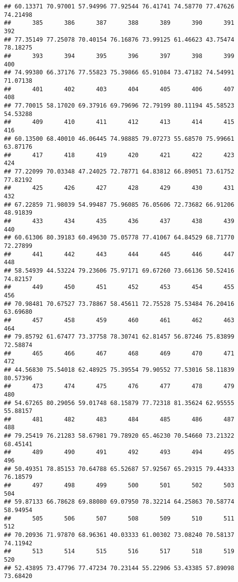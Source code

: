 \documentclass[
]{article}
\begin{document}
\begin{verbatim}
## 60.13371 70.97001 57.94996 77.92544 76.41741 74.58770 77.47626 74.21498 
##      385      386      387      388      389      390      391      392 
## 77.35149 77.25078 70.40154 76.16876 73.99125 61.46623 43.75474 78.18275 
##      393      394      395      396      397      398      399      400 
## 74.99380 66.37176 77.55823 75.39866 65.91084 73.47182 74.54991 71.07138 
##      401      402      403      404      405      406      407      408 
## 77.70015 58.17020 69.37916 69.79696 72.79199 80.11194 45.58523 54.53288 
##      409      410      411      412      413      414      415      416 
## 60.13500 68.40010 46.06445 74.98885 79.07273 55.68570 75.99661 63.87176 
##      417      418      419      420      421      422      423      424 
## 77.22099 70.03348 47.24025 72.78771 64.83812 66.89051 73.61752 77.82192 
##      425      426      427      428      429      430      431      432 
## 67.22859 71.98039 54.99487 75.96085 76.05606 72.73682 66.91206 48.91839 
##      433      434      435      436      437      438      439      440 
## 60.61306 80.39183 60.49630 75.05778 77.41067 64.84529 68.71770 72.27899 
##      441      442      443      444      445      446      447      448 
## 58.54939 44.53224 79.23606 75.97171 69.67260 73.66136 50.52416 74.82157 
##      449      450      451      452      453      454      455      456 
## 70.98481 70.67527 73.78867 58.45611 72.75528 75.53484 76.20416 63.69680 
##      457      458      459      460      461      462      463      464 
## 79.85792 61.67477 73.37758 78.30741 62.81457 56.87246 75.83899 72.58874 
##      465      466      467      468      469      470      471      472 
## 44.56830 75.54018 62.48925 75.39554 79.90552 77.53016 58.11839 80.57396 
##      473      474      475      476      477      478      479      480 
## 54.67265 80.29056 59.01748 68.15879 77.72318 81.35624 62.95555 55.88157 
##      481      482      483      484      485      486      487      488 
## 79.25419 76.21283 58.67981 79.78920 65.46230 70.54660 73.21322 68.45141 
##      489      490      491      492      493      494      495      496 
## 50.49351 78.85153 70.64788 65.52687 57.92567 65.29315 79.44333 76.18579 
##      497      498      499      500      501      502      503      504 
## 59.87133 66.78628 69.88080 69.07950 78.32214 64.25863 70.58774 58.94954 
##      505      506      507      508      509      510      511      512 
## 70.20936 71.97870 68.96361 40.03333 61.00302 73.08240 70.58137 74.11942 
##      513      514      515      516      517      518      519      520 
## 52.43895 73.47796 77.47234 70.23144 55.22906 53.43385 57.89098 73.68420 

\end{verbatim}
\end{document}
